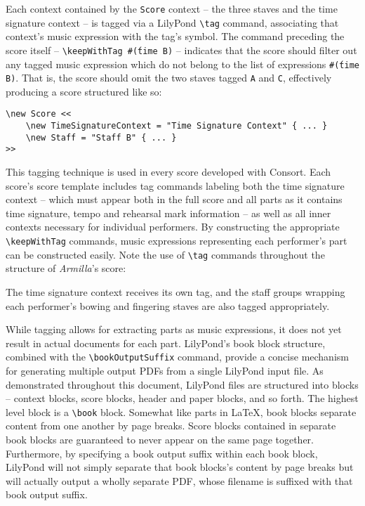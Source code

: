 \noindent Each context contained by the \texttt{Score} context -- the three
staves and the time signature context -- is tagged via a LilyPond
\texttt{\textbackslash{}tag} command, associating that context's music
expression with the tag's symbol. The command preceding the score itself --
\texttt{\textbackslash{}keepWithTag \#\'(time B)} -- indicates that the score
should filter out any tagged music expression which do not belong to the list
of expressions \texttt{\#\'(time B)}. That is, the score should omit the two
staves tagged \texttt{A} and \texttt{C}, effectively producing a score
structured like so:

\begin{singlespacing}
\vspace{-0.5\baselineskip}
\begin{verbatim}
\new Score <<
    \new TimeSignatureContext = "Time Signature Context" { ... }
    \new Staff = "Staff B" { ... }
>>
\end{verbatim}
\end{singlespacing}

\noindent This tagging technique is used in every score developed with Consort.
Each score's score template includes tag commands labeling both the time
signature context -- which must appear both in the full score and all parts as
it contains time signature, tempo and rehearsal mark information -- as well as
all inner contexts necessary for individual performers. By constructing the
appropriate \texttt{\textbackslash{}keepWithTag} commands, music expressions
representing each performer's part can be constructed easily.
Note the use of \texttt{\textbackslash{}tag} commands throughout the structure
of \emph{Armilla}'s score:


\noindent The time signature context receives its own tag, and the staff groups
wrapping each performer's bowing and fingering staves are also tagged
appropriately.

While tagging allows for extracting parts as music expressions, it does not yet
result in actual documents for each part. LilyPond's book block structure,
combined with the \texttt{\textbackslash{}bookOutputSuffix} command, provide a
concise mechanism for generating multiple output PDFs from a single LilyPond
input file. As demonstrated throughout this document, LilyPond files are
structured into blocks -- context blocks, score blocks, header and paper
blocks, and so forth. The highest level block is a
\texttt{\textbackslash{}book} block. Somewhat like parts in LaTeX, book blocks
separate content from one another by page breaks. Score blocks contained in
separate book blocks are guaranteed to never appear on the same page together.
Furthermore, by specifying a book output suffix within each book block,
LilyPond will not simply separate that book blocks's content by page breaks but
will actually output a wholly separate PDF, whose filename is suffixed with
that book output suffix.

